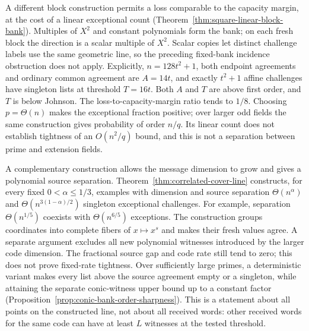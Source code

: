 \documentclass[11pt,letterpaper]{article}
\theoremstyle{definition}
\theoremstyle{remark}
\begin{document}
A different block construction permits a loss comparable to the
capacity margin, at the cost of a linear exceptional count
(Theorem~\ref{thm:square-linear-block-bank}). Multiples of $X^2$ and
constant polynomials form the bank; on each fresh block the direction is
a scalar multiple of $X^2$. Scalar copies let distinct challenge labels
use the same geometric line, so the preceding fixed-bank incidence
obstruction does not apply. Explicitly, $n=128t^2+1$, both endpoint
agreements and ordinary common agreement are $A=14t$, and exactly
$t^2+1$ affine challenges have singleton lists at threshold $T=16t$.
Both $A$ and $T$ are above first order, and $T$ is below Johnson.
The loss-to-capacity-margin ratio tends to $1/8$. Choosing $p=\Theta(n)$
makes the exceptional fraction positive; over larger odd fields the
same construction gives probability of order $n/q$. Its linear count
does not establish tightness of an $O(n^2/q)$ bound, and this is not
a separation between prime and extension fields.

A complementary construction allows the message dimension to grow
and gives a polynomial source separation. Theorem~\ref{thm:correlated-cover-line} constructs, for every
fixed $0<\alpha\le1/3$, examples with dimension and source separation
$\Theta(n^\alpha)$ and $\Theta(n^{3(1-\alpha)/2})$ singleton exceptional
challenges. For example, separation $\Theta(n^{1/5})$ coexists with
$\Theta(n^{6/5})$ exceptions. The construction groups coordinates into
complete fibers of $x\mapsto x^s$ and makes their fresh values agree.
A separate argument excludes all new polynomial witnesses introduced by
the larger code dimension. The fractional source gap and code rate still
tend to zero; this does not prove fixed-rate tightness.
Over sufficiently large primes, a deterministic variant makes every list
above the source agreement empty or a singleton, while attaining the
separate conic-witness upper bound up to a constant factor
(Proposition~\ref{prop:conic-bank-order-sharpness}). This is a statement
about all points on the constructed line, not about all received words:
other received words for the same code can have at least $L$ witnesses
at the tested threshold.
\end{document}

